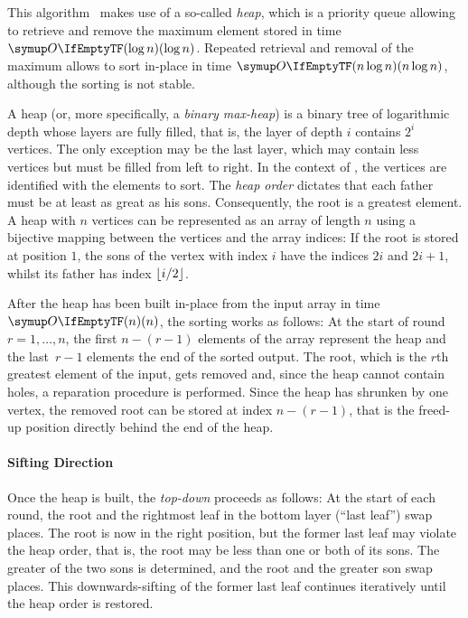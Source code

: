 \section{\texorpdfstring{\HS{}}{HeapSort}}
\label{sec:tasklet:heap}

This algorithm~\cites{floyd1964treesort}{williams1964heapsort}[Chapter~2.2.5]{wirth1975algorithmen} makes use of a so-called \emph{heap}, which is a priority queue allowing to retrieve and remove the maximum element stored in time \(\bigoh{\log n}\).
Repeated retrieval and removal of the maximum allows to sort in-place in time \(\bigoh{n \log n}\), although the sorting is not stable.

A heap (or, more specifically, a \emph{binary max-heap}) is a binary tree of logarithmic depth whose layers are fully filled, that is, the layer of depth \(i\) contains \(2^i\) vertices.
The only exception may be the last layer, which may contain less vertices but must be filled from left to right.
In the context of \HS{}, the vertices are identified with the elements to sort.
The \emph{heap order} dictates that each father must be at least as great as his sons.
Consequently, the root is a greatest element.
A heap with \(n\) vertices can be represented as an array of length \(n\) using a bijective mapping between the vertices and the array indices:
If the root is stored at position \(1\), the sons of the vertex with index \(i\) have the indices \(2 i\) and \(2 i + 1\), whilst its father has index \(\lfloor i / 2\rfloor\).

After the heap has been built in-place from the input array in time \(\bigoh{n}\), the sorting works as follows:
At the start of round~\(r = 1, \dots, n\), the first \(n - (r - 1)\) elements of the array represent the heap and the last~\(r - 1\) elements the end of the sorted output.
The root, which is the \(r\)th greatest element of the input, gets removed and, since the heap cannot contain holes, a reparation procedure is performed.
Since the heap has shrunken by one vertex, the removed root can be stored at index \(n - (r - 1)\), that is the freed-up position directly behind the end of the heap.


\paragraph{Sifting Direction}
Once the heap is built, the \emph{top-down} \HS{} proceeds as follows:
At the start of each round, the root and the rightmost leaf in the bottom layer (\enquote{last leaf}) swap places.
The root is now in the right position, but the former last leaf may violate the heap order, that is, the root may be less than one or both of its sons.
The greater of the two sons is determined, and the root and the greater son swap places.
This downwards-sifting of the former last leaf continues iteratively until the heap order is restored.


